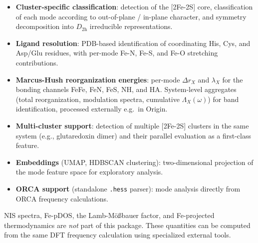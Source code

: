 \documentclass[11pt,a4paper,twoside]{article}
\theoremstyle{remark}
\begin{document}
\begin{itemize}
  \item \textbf{Cluster-specific classification}: detection of the
        {[}2Fe-2S{]} core, classification of each mode according to
        out-of-plane / in-plane character, and symmetry decomposition
        into $D_\mathrm{2h}$ irreducible representations.
  \item \textbf{Ligand resolution}: PDB-based identification of
        coordinating His, Cys, and Asp/Glu residues, with per-mode
        Fe-N, Fe-S, and Fe-O stretching contributions.
  \item \textbf{Marcus-Hush reorganization energies}: per-mode
        $\Delta r_X$ and $\lambda_X$ for the bonding channels FeFe,
        FeN, FeS, NH, and HA. System-level aggregates (total
        reorganization, modulation spectra, cumulative
        $\Lambda_X(\omega)$) for band identification, processed
        externally e.g.\ in Origin.
  \item \textbf{Multi-cluster support}: detection of multiple
        {[}2Fe-2S{]} clusters in the same system (e.g., glutaredoxin
        dimer) and their parallel evaluation as a first-class feature.
  \item \textbf{Embeddings} (UMAP, HDBSCAN clustering):
        two-dimensional projection of the mode feature space for
        exploratory analysis.
  \item \textbf{ORCA support} (standalone \texttt{.hess} parser):
        mode analysis directly from ORCA frequency calculations.
\end{itemize}

NIS spectra, Fe-pDOS, the Lamb-M\"o\ss bauer factor, and
Fe-projected thermodynamics are \emph{not} part of this package.
These quantities can be computed from the same DFT frequency
calculation using specialized external tools.
\end{document}
